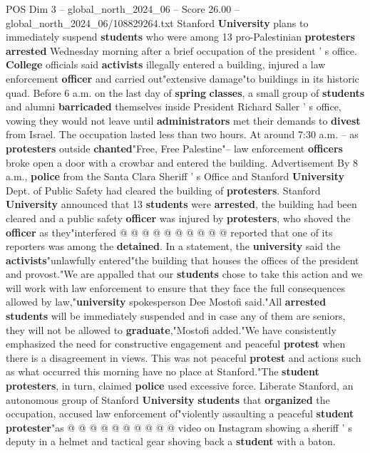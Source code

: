 \begin{textsample}{POS Dim 3 – global\_north\_2024\_06 – Score 26.00 – global\_north\_2024\_06/108829264.txt}  \label{ex:f3_pos_071}
Stanford \textbf{University} plans to immediately suspend \textbf{students} who were among 13 pro-Palestinian \textbf{protesters} \textbf{arrested} Wednesday morning after a brief occupation of the president ' s office. \textbf{College} officials said \textbf{activists} illegally entered a building, injured a law enforcement \textbf{officer} and carried out"extensive damage"to buildings in its historic quad.
Before 6 a.m. on the last day of \textbf{spring} \textbf{classes}, a small group of \textbf{students} and alumni \textbf{barricaded} themselves inside President Richard Saller ' s office, vowing they would not leave until \textbf{administrators} met their demands to \textbf{divest} from Israel.
The occupation lasted less than two hours.
At around 7:30 a.m. -- as \textbf{protesters} outside \textbf{chanted}"Free, Free Palestine"-- law enforcement \textbf{officers} broke open a door with a crowbar and entered the building.
Advertisement By 8 a.m., \textbf{police} from the Santa Clara Sheriff ' s Office and Stanford \textbf{University} Dept. of Public Safety had cleared the building of \textbf{protesters}.
Stanford \textbf{University} announced that 13 \textbf{students} were \textbf{arrested}, the building had been cleared and a public safety \textbf{officer} was injured by \textbf{protesters}, who shoved the \textbf{officer} as they"interfered @ @ @ @ @ @ @ @ @ @ reported that one of its reporters was among the \textbf{detained}.
In a statement, the \textbf{university} said the \textbf{activists}"unlawfully entered"the building that houses the offices of the president and provost."We are appalled that our \textbf{students} chose to take this action and we will work with law enforcement to ensure that they face the full consequences allowed by law,"\textbf{university} spokesperson Dee Mostofi said."All \textbf{arrested} \textbf{students} will be immediately suspended and in case any of them are seniors, they will not be allowed to \textbf{graduate},"Mostofi added."We have consistently emphasized the need for constructive engagement and peaceful \textbf{protest} when there is a disagreement in views.
This was not peaceful \textbf{protest} and actions such as what occurred this morning have no place at Stanford."The \textbf{student} \textbf{protesters}, in turn, claimed \textbf{police} used excessive force.
Liberate Stanford, an autonomous group of Stanford \textbf{University} \textbf{students} that \textbf{organized} the occupation, accused law enforcement of"violently assaulting a peaceful \textbf{student} \textbf{protester}"as @ @ @ @ @ @ @ @ @ @ video on Instagram showing a sheriff ' s deputy in a helmet and tactical gear shoving back a \textbf{student} with a baton.

\end{textsample}

